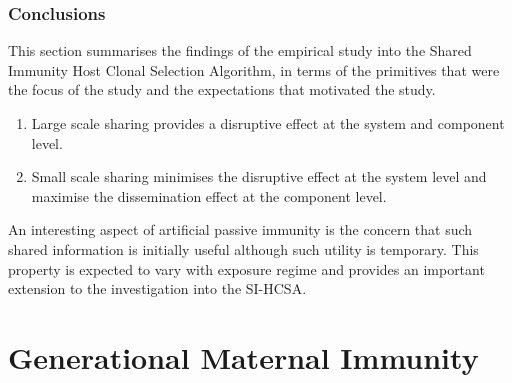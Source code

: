 %
%
\subsubsection{Conclusions}
This section summarises the findings of the empirical study into the Shared Immunity Host Clonal Selection Algorithm, in terms of the primitives that were the focus of the study and the expectations that motivated the study.

\begin{enumerate}
	\item Large scale sharing provides a disruptive effect at the system and component level.
	\item Small scale sharing minimises the disruptive effect at the system level and maximise the dissemination effect at the component level.
\end{enumerate}

An interesting aspect of artificial passive immunity is the concern that such shared information is initially useful although such utility is temporary. This property is expected to vary with exposure regime and provides an important extension to the investigation into the SI-HCSA.

%
%
\section{Generational Maternal Immunity}
\label{sec:hosts:generational:maternal}

%
%
